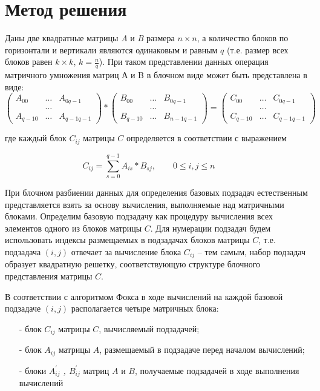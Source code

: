 \documentclass{report}
\begin{document}
\section*{Метод решения}
Даны две квадратные матрицы {\itshape A} и {\itshape B} размера {\itshape $n \times n$}, а количество блоков по горизонтали и вертикали являются одинаковым и равным {\itshape $q$} (т.е. размер всех блоков равен {\itshape $k \times k$}, {\itshape $k = \frac{n}{q} $}). При таком представлении данных операция матричного умножения матриц А и B в блочном виде может быть представлена в виде:
$$
\begin{pmatrix}
A_{00}& \ldots & A_{0q-1}\\
& \ldots\\
A_{q-10}& \ldots & A_{q-1q-1}
\end{pmatrix}
*
\begin{pmatrix}
B_{00}& \ldots & B_{0q-1}\\
& \ldots\\
B_{q-10}& \ldots & B_{n-1q-1}
\end{pmatrix}
=
\begin{pmatrix}
C_{00}& \ldots & C_{0q-1}\\
&\ldots\\
C_{q-10}& \ldots & C_{q-1q-1}
\end{pmatrix}
$$

где каждый блок $C_{ij}$ матрицы {\itshape $C$} определяется в соответствии с выражением
\par$$
    C_{ij} = \sum_{s=0}^{q-1} A_{is} * B_{sj},\qquad 0 \le i,j \le n \qquad
    $$
\par При блочном разбиении данных для определения базовых подзадач естественным представляется взять за основу вычисления, выполняемые над матричными блоками. Определим базовую подзадачу как процедуру вычисления всех элементов одного из блоков матрицы {\itshape $C$}. Для нумерации подзадач будем использовать индексы размещаемых в подзадачах блоков матрицы {\itshape $C$}, т.е. подзадача {\itshape $(i,j)$} отвечает за вычисление блока {\itshape $C_{ij}$} – тем самым, набор подзадач образует квадратную решетку, соответствующую структуре блочного представления матрицы {\itshape $C$}.
\par В соответствии с алгоритмом Фокса в ходе вычислений на каждой базовой подзадаче {\itshape $(i,j)$} располагается четыре матричных блока:
\begin{itemize}
    \item[-] блок {\itshape $C_{ij}$} матрицы {\itshape $C$}, вычисляемый подзадачей;
    \item[-] блок {\itshape $A_{ij}$} матрицы {\itshape $A$}, размещаемый в подзадаче перед началом вычислений;
    \item[-] блоки {\itshape $A_{ij}^{'}$ , $B_{ij}^{'}$} матриц {\itshape $A$} и {\itshape $B$}, получаемые подзадачей в ходе выполнения вычислений
\end{itemize}
\newpage
\end{document}
